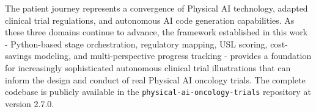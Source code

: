 \documentclass{article}
\begin{document}
The patient journey represents a convergence of Physical AI technology, adapted clinical trial regulations, and autonomous AI code generation capabilities. As these three domains continue to advance, the framework established in this work - Python-based stage orchestration, regulatory mapping, USL scoring, cost-savings modeling, and multi-perspective progress tracking - provides a foundation for increasingly sophisticated autonomous clinical trial illustrations that can inform the design and conduct of real Physical AI oncology trials. The complete codebase is publicly available in the \texttt{physical-ai-oncology-trials} repository at version 2.7.0.

\end{document}
